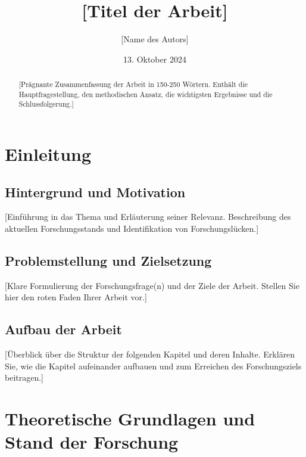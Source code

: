 \documentclass[12pt,a4paper,oneside]{article}
\title{[Titel der Arbeit]}
\author{[Name des Autors]}
\date{13. Oktober 2024}
\begin{document}
\begin{titlepage}
    \maketitle
    \thispagestyle{empty}
    
    \begin{abstract}
        [Prägnante Zusammenfassung der Arbeit in 150-250 Wörtern. Enthält die Hauptfragestellung, den methodischen Ansatz, die wichtigsten Ergebnisse und die Schlussfolgerung.]
    \end{abstract}
\end{titlepage}
    

\tableofcontents
\clearpage

\listoffigures
\listoftables
\clearpage


\section{Einleitung}
\subsection{Hintergrund und Motivation}
[Einführung in das Thema und Erläuterung seiner Relevanz. Beschreibung des aktuellen Forschungsstands und Identifikation von Forschungslücken.]

\subsection{Problemstellung und Zielsetzung}
[Klare Formulierung der Forschungsfrage(n) und der Ziele der Arbeit. Stellen Sie hier den roten Faden Ihrer Arbeit vor.]

\subsection{Aufbau der Arbeit}
[Überblick über die Struktur der folgenden Kapitel und deren Inhalte. Erklären Sie, wie die Kapitel aufeinander aufbauen und zum Erreichen des Forschungsziels beitragen.]

\clearpage
\section{Theoretische Grundlagen und Stand der Forschung}
\end{document}
